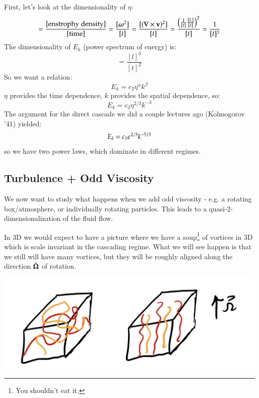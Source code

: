 First, let's look at the dimensionality of $\eta$:
\begin{equation}
    [\eta] = \frac{[\text{enstrophy density}]}{[\text{time}]} = \frac{[\gv{\omega}^2]}{[t]} = \frac{[(\nabla \times \v{v})^2]}{[t]} = \frac{\left(\frac{1}{[t]}\frac{[L]}{[t]}\right)^2}{[t]} = \frac{1}{[t]^3}
\end{equation}
The dimensionality of $E_k$ (power spectrum of energy) is:
\begin{equation}
    [E_k] = \frac{[l]^3}{[t]^2}
\end{equation}
So we want a relation:
\begin{equation}
    E_k = c_2\eta^{\alpha}k^{\beta}
\end{equation}
$\eta$ provides the time dependence, $k$ provides the spatial dependence, so:
\begin{equation}
    E_k = c_2\eta^{2/3}k^{-3}
\end{equation}
The argument for the direct cascade we did a couple lectures ago (Kolmogorov '41) yielded:
\begin{equation}
    E_k = c_1\epsilon^{2/3}k^{-5/3}
\end{equation}
so we have two power laws, which dominate in different regimes.

\subsection{Turbulence + Odd Viscosity}
We now want to study what happens when we add odd viscosity - e.g. a rotating box/atmosphere, or individually rotating particles. This leads to a quasi-2-dimensionalization of the fluid flow.

In 3D we would expect to have a picture where we have a soup\footnote{You shouldn't eat it.} of vortices in 3D which is scale invariant in the cascading regime. What we will see happen is that we still will have many vortices, but they will be roughly aligned along the direction $\hat{\mbox{\boldmath$ \Omega $}}$ of rotation.

\begin{center}
    \includegraphics[scale=0.4]{Lectures/Images/lec15-vortices.png}
\end{center}


